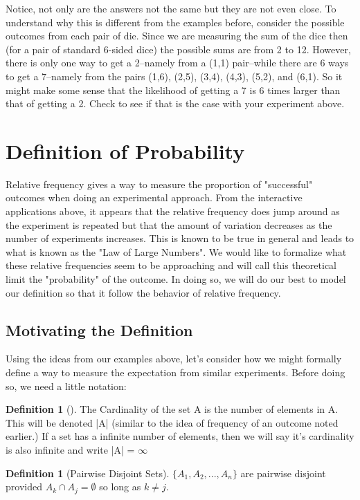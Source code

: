 \documentclass[10pt,]{book}
\theoremstyle{plain}
\theoremstyle{definition}
\newtheorem{definition}[theorem]{Definition}
\theoremstyle{definition}
\theoremstyle{definition}
\numberwithin{equation}{section}
\begin{document}
\par
Notice, not only are the answers not the same but they are not even close. To understand why this 
	is different from the examples before, consider the possible outcomes from each pair of die. Since we
	are measuring the sum of the dice then (for a pair of standard 6-sided dice) the possible sums are from 
	2 to 12. However, there is only one way to get a 2--namely from a (1,1) pair--while there are 6 ways to get
	a 7--namely from the pairs (1,6), (2,5), (3,4), (4,3), (5,2), and (6,1). So it might make some sense
	that the likelihood of getting a 7 is 6 times larger than that of getting a 2. Check to see if that
	is the case with your experiment above.%
\typeout{************************************************}
\typeout{************************************************}
\section[Definition of Probability]{Definition of Probability}\label{section-18}
\typeout{************************************************}
\typeout{************************************************}

		Relative frequency gives a way to measure the proportion of "successful" outcomes when doing an experimental approach. From the interactive applications above, it appears that the relative frequency does jump around as the experiment is repeated but that the amount of variation decreases as the number of experiments increases. This is known to be true in general and leads to what is known as the "Law of Large Numbers". We would like to formalize what these relative frequencies seem to be approaching and will call this theoretical limit the "probability" of the outcome. In doing so, we will do our best to model our definition so that it follow the behavior of relative frequency.
\typeout{************************************************}
\typeout{************************************************}
\subsection[Motivating the Definition]{Motivating the Definition}\label{ProbabilityDefns}
Using the ideas from our examples above, let's consider how we might formally define a way
		to measure the expectation from similar experiments.  Before doing so, we need a little notation:%
\begin{definition}[]\label{definition-20}
The Cardinality of the set A is the number of elements in A. This will be denoted |A| (similar
			to the idea of frequency of an outcome noted earlier.) If a set has
			a infinite number of elements, then we will say it's cardinality is also infinite and 
			write |A| = \(\infty\)\end{definition}
\begin{definition}[Pairwise Disjoint Sets]\label{definition-21}
\( \{ A_1, A_2, ... , A_n \}\) are pairwise disjoint provided \(A_k \cap A_j = \emptyset\) so long as \(k \ne j\).
			\end{definition}
\par
\end{document}
